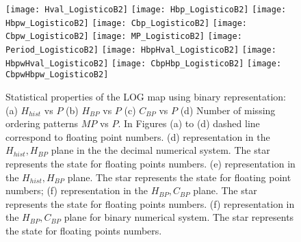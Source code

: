 \begin{figure}
	\texttt{[image: Hval\_LogisticoB2]}
	\texttt{[image: Hbp\_LogisticoB2]}
	\texttt{[image: Hbpw\_LogisticoB2]}
	\texttt{[image: Cbp\_LogisticoB2]}
	\texttt{[image: Cbpw\_LogisticoB2]}
	\texttt{[image: MP\_LogisticoB2]}
	\texttt{[image: Period\_LogisticoB2]}
	\texttt{[image: HbpHval\_LogisticoB2]}
	\texttt{[image: HbpwHval\_LogisticoB2]}
	\texttt{[image: CbpHbp\_LogisticoB2]}
	\texttt{[image: CbpwHbpw\_LogisticoB2]}
	\caption{Statistical properties of the LOG map using binary representation: (a) $H_{hist}$ vs $P$ (b) $H_{BP}$ vs $P$ (c) $C_{BP}$ vs $P$ (d) Number of missing ordering patterns $MP$ vs $P$. In Figures (a) to (d) dashed line correspond to floating point numbers. (d) representation in the $H_{hist},H_{BP}$ plane in the the decimal numerical system.  The star represents the state for floating points numbers. (e) representation in the $H_{hist},H_{BP}$ plane. The star represents the state for floating point numbers; (f) representation in the $H_{BP},C_{BP}$ plane.  The star represents the state for floating points numbers. (f) representation in the $H_{BP},C_{BP}$ plane for binary numerical system.  The star represents the state for floating points numbers. } \label{fig:LOGbinario}
\end{figure}

